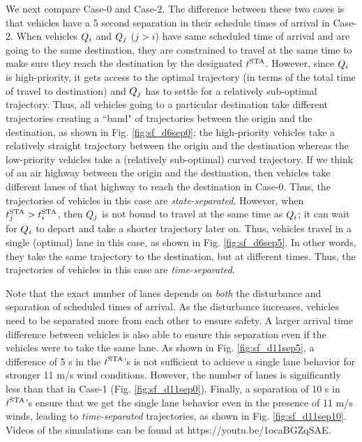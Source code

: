 We next compare Case-0 and Case-2. The difference between these two cases is that vehicles have a 5 second separation in their schedule times of arrival in Case-2. When vehicles $Q_i$ and $Q_{j}$ ($j>i$) have same scheduled time of arrival and are going to the same destination, they are constrained to travel at the same time to make sure they reach the destination by the designated $t^\text{STA}$. However, since $Q_i$ is high-priority, it gets access to the optimal trajectory (in terms of the total time of travel to destination) and $Q_{j}$ has to settle for a relatively sub-optimal trajectory. Thus, all vehicles going to a particular destination take different trajectories creating a ``band" of trajectories between the origin and the destination, as shown in Fig. \ref{fig:sf_d6sep0}; the high-priority vehicles take a relatively straight trajectory between the origin and the destination whereas the low-priority vehicles take a (relatively sub-optimal) curved trajectory. If we think of an air highway between the origin and the destination, then vehicles take different lanes of that highway to reach the destination in Case-0. Thus, the trajectories of vehicles in this case are \textit{state-separated}. However, when $t^\text{STA}_j > t^\text{STA}_i$, then $Q_j$ is not bound to travel at the same time as $Q_i$; it can wait for $Q_i$ to depart and take a shorter trajectory later on. Thus, vehicles travel in a single (optimal) lane in this case, as shown in Fig. \ref{fig:sf_d6sep5}. In other words, they take the same trajectory to the destination, but at different times. Thus, the trajectories of vehicles in this case are \textit{time-separated}. 

Note that the exact number of lanes depends on \textit{both} the disturbance and separation of scheduled times of arrival. As the disturbance increases, vehicles need to be separated more from each other to ensure safety. A larger arrival time difference between vehicles is also able to ensure this separation even if the vehicles were to take the same lane. As shown in Fig. \ref{fig:sf_d11sep5}, a difference of 5 s in the $t^\text{STA}$'s is not sufficient to achieve a single lane behavior for stronger 11 m/s wind conditions. However, the number of lanes is significantly less than that in Case-1 (Fig. \ref{fig:sf_d11sep0}). Finally, a separation of 10 s in $t^\text{STA}$'s ensure that we get the single lane behavior even in the presence of 11 m/s winds, leading to \textit{time-separated} trajectories, as shown in Fig. \ref{fig:sf_d11sep10}. Videos of the simulations can be found at https://youtu.be/1ocaBGZqSAE.

